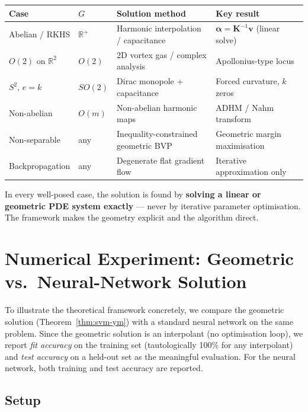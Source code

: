 \documentclass[11pt, a4paper]{article}
\theoremstyle{plain}
\theoremstyle{definition}
\newcommand{\R}{\mathbb{R}}
\begin{document}
\begin{center}
\renewcommand{\arraystretch}{1.3}
\begin{tabular}{@{}llll@{}}
\toprule
\textbf{Case} & \textbf{$G$} & \textbf{Solution method} & \textbf{Key result} \\
\midrule
Abelian / RKHS & $\mathbb{R}^+$ & Harmonic interpolation / capacitance
  & $\boldsymbol{\alpha} = \mathbf{K}^{-1}\mathbf{v}$ (linear solve) \\
$O(2)$ on $\R^2$ & $O(2)$ & 2D vortex gas / complex analysis
  & Apollonius-type locus \\
$S^2$, $e=k$ & $SO(2)$ & Dirac monopole + capacitance
  & Forced curvature, $k$ zeros \\
Non-abelian & $O(m)$ & Non-abelian harmonic maps
  & ADHM / Nahm transform \\
Non-separable & any & Inequality-constrained geometric BVP
  & Geometric margin maximisation \\
Backpropagation & any & Degenerate flat gradient flow
  & Iterative approximation only \\
\bottomrule
\end{tabular}
\end{center}

\medskip
In every well-posed case, the solution is found by \textbf{solving a linear or
geometric PDE system exactly} --- never by iterative parameter optimisation. The
framework makes the geometry explicit and the algorithm direct.

\section{Numerical Experiment: Geometric vs.\ Neural-Network Solution}%
\label{sec:experiment}

To illustrate the theoretical framework concretely, we compare the geometric
solution (Theorem~\ref{thm:svm-ym}) with a standard neural network on the same
problem. Since the geometric solution is an interpolant (no optimisation loop),
we report \emph{fit accuracy} on the training set (tautologically 100\% for any
interpolant) and \emph{test accuracy} on a held-out set as the meaningful
evaluation. For the neural network, both training and test accuracy are reported.

\subsection{Setup}
\end{document}
